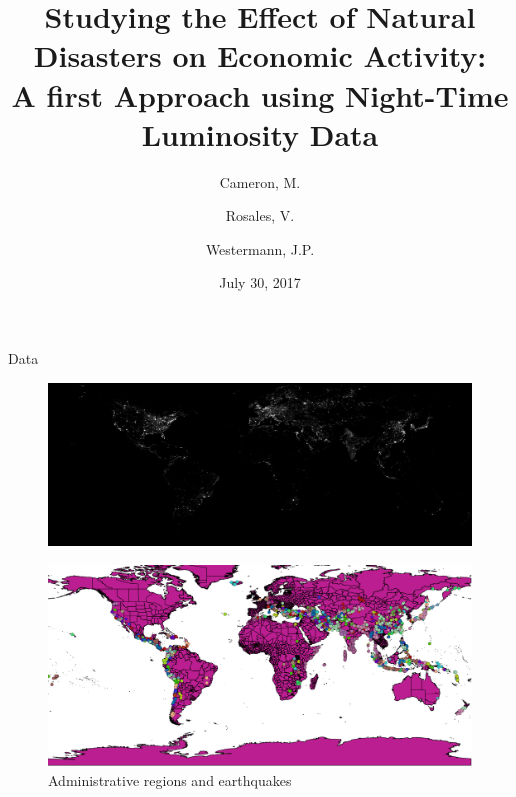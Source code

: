 \documentclass{beamer}
\title{
  Studying the Effect of Natural Disasters on Economic Activity:\\
  \large{A first Approach using Night-Time Luminosity Data}
}
\author{Cameron, M. \and Rosales, V. \and Westermann, J.P.}
\date{July 30, 2017}
\begin{document}
\begin{frame}
  \maketitle
\end{frame}

\begin{section}{Data}
  \begin{frame}
    \begin{figure}
      \centering
      \includegraphics[width=1\linewidth]{lum_2013}\label{lum_2013}
    \end{figure}			
  \end{frame}

  \begin{frame}
    \begin{figure}
      \centering
      \includegraphics[width=1\linewidth]{world_regions}
      \caption{Administrative regions and earthquakes}\label{eq}
    \end{figure}
  \end{frame}
\end{section}
\end{document}
